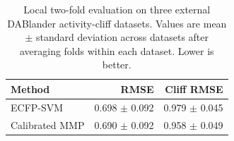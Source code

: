 \begin{table}[t]
\centering
\caption{Local two-fold evaluation on three external DABlander activity-cliff datasets. Values are mean $\mathbin{\pm}$ standard deviation across datasets after averaging folds within each dataset. Lower is better.}
\label{tab:dablander-external}
\small
\begin{tabular}{lrr}
\toprule
Method & RMSE & Cliff RMSE\\
\midrule
ECFP-SVM & 0.698 $\mathbin{\pm}$ 0.092 & 0.979 $\mathbin{\pm}$ 0.045\\
Calibrated MMP & 0.690 $\mathbin{\pm}$ 0.092 & 0.958 $\mathbin{\pm}$ 0.049\\
\bottomrule
\end{tabular}
\end{table}
